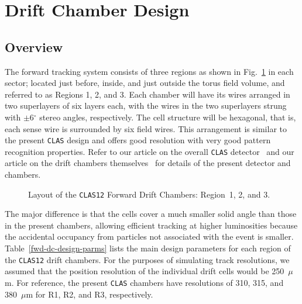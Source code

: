 \section{Drift Chamber Design}

\subsection{Overview}

The forward tracking system consists of three regions as shown in 
Fig.~\ref{fig:CLAS12 FDC} in each sector; located just before, inside, and 
just outside the torus field volume, and referred to as Regions 1, 2, and 3.  
Each chamber will have its wires arranged in two superlayers of six layers 
each, with the wires in the two superlayers strung with $\pm$6$^\circ$
stereo angles, respectively.  The cell structure will be hexagonal, that is, 
each sense wire is surrounded by six field wires.  This arrangement is 
similar to the present {\tt CLAS} design and offers good resolution with 
very good pattern recognition properties.  Refer to our article on the 
overall {\tt CLAS} detector~\cite{clasnim} and our article on the drift 
chambers themselves~\cite{dcnim} for details of the present detector and 
chambers.

\begin{figure}[hb]
\vspace{10.6cm}
\caption{\small{Layout of the {\tt CLAS12} Forward Drift Chambers: Region~1, 
2, and 3.}}
\label{fig:CLAS12 FDC}
\end{figure}

The major difference is that the cells cover a much smaller solid angle
than those in the present chambers, allowing efficient tracking at higher 
luminosities because the accidental occupancy from particles not associated 
with the event is smaller. Table~\ref{fwd-dc-design-parms} lists the main
design parameters for each region of the {\tt CLAS12} drift chambers.  For 
the purposes of simulating track resolutions, we assumed that the position 
resolution of the individual drift cells would be 250~$\mu$m.  For reference, 
the present {\tt CLAS} chambers have resolutions of 310, 315, and 380~$\mu$m 
for R1, R2, and R3, respectively.

